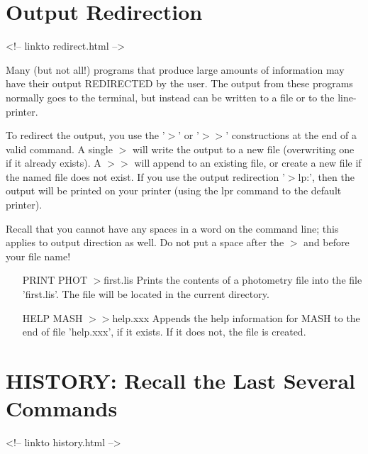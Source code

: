 \section{Output Redirection}
\begin{rawhtml}
<!-- linkto redirect.html -->
\end{rawhtml}


Many (but not all!) programs that produce large amounts of information may
have their output REDIRECTED by the user.  The output from these programs
normally goes to the terminal, but instead can be written to a file or to
the line-printer.

To redirect the output, you use the '$>$' or '$>>$' constructions at the
end of a valid command.  A single $>$ will write the output to a new file
(overwriting one if it already exists).  A $>>$ will append to an existing
file, or create a new file if the named file does not exist. If you use the
output redirection '$>$lp:', then the output will be printed on your
printer (using the lpr command to the default printer).

Recall that you cannot have any spaces in a word on the command line; this
applies to output direction as well. Do not put a space after the $>$ and
before your file name!


\begin{itemize}
  \item[PRINT PHOT $>$first.lis\hfill]{Prints the contents of a 
       photometry file into the file 'first.lis'.  The file will be
       located in the current directory.}
 
   \item[HELP MASH $>>$help.xxx\hfill]{Appends the help information for
        MASH to the end of file 'help.xxx', if it exists.  If it does not,
        the file is created.}
\end{itemize}

\section{HISTORY: Recall the Last Several Commands }
\begin{rawhtml}
<!-- linkto history.html -->
\end{rawhtml}

